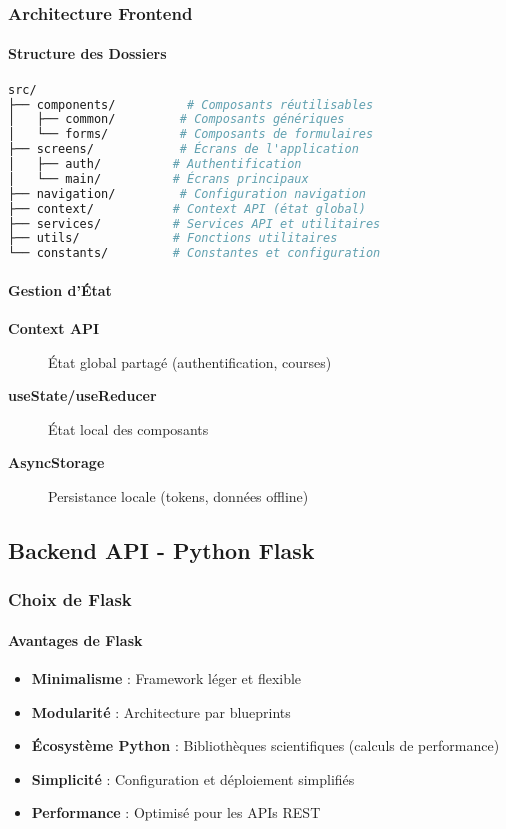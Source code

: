 \subsubsection{Architecture Frontend}

\paragraph{Structure des Dossiers}
\begin{lstlisting}[language=bash]
src/
├── components/          # Composants réutilisables
│   ├── common/         # Composants génériques
│   └── forms/          # Composants de formulaires
├── screens/            # Écrans de l'application
│   ├── auth/          # Authentification
│   └── main/          # Écrans principaux
├── navigation/         # Configuration navigation
├── context/           # Context API (état global)
├── services/          # Services API et utilitaires
├── utils/             # Fonctions utilitaires
└── constants/         # Constantes et configuration
\end{lstlisting}

\paragraph{Gestion d'État}
\begin{description}
    \item[\textbf{Context API}] État global partagé (authentification, courses)
    \item[\textbf{useState/useReducer}] État local des composants
    \item[\textbf{AsyncStorage}] Persistance locale (tokens, données offline)
\end{description}

\subsection{Backend API - Python Flask}

\subsubsection{Choix de Flask}

\paragraph{Avantages de Flask}
\begin{itemize}
    \item \textbf{Minimalisme} : Framework léger et flexible
    \item \textbf{Modularité} : Architecture par blueprints
    \item \textbf{Écosystème Python} : Bibliothèques scientifiques (calculs de performance)
    \item \textbf{Simplicité} : Configuration et déploiement simplifiés
    \item \textbf{Performance} : Optimisé pour les APIs REST
\end{itemize}

